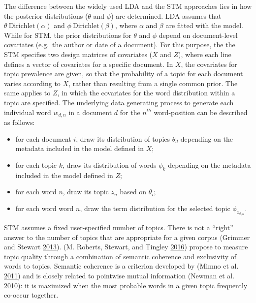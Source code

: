 \documentclass[
]{article}
\providecommand{\tightlist}{%
  \setlength{\itemsep}{0pt}\setlength{\parskip}{0pt}}
\begin{document}
The difference between the widely used LDA and the STM approaches lies
in how the posterior distributions (\(\theta\) and \(\phi\)) are
determined. LDA assumes that \(\theta ~ \text{Dirichlet}(\alpha)\) and
\(\phi ~ \text{Dirichlet}(\beta)\), where \(\alpha\) and \(\beta\) are
fitted with the model. While for STM, the prior distributions for
\(\theta\) and \(\phi\) depend on document-level covariates (e.g.~the
author or date of a document). For this purpose, the the STM specifies
two design matrices of covariates (\(X\) and \(Z\)), where each line
defines a vector of covariates for a specific document. In \(X\), the
covariates for topic prevalence are given, so that the probability of a
topic for each document varies according to \(X\), rather than resulting
from a single common prior. The same applies to \(Z\), in which the
covariates for the word distribution within a topic are specified. The
underlying data generating process to generate each individual word
\(w_{d,n}\) in a document \(d\) for the \(n^{th}\) word-position can be
described as follows:

\begin{itemize}
\tightlist
\item
  for each document \(i\), draw its distribution of topics \(\theta_d\)
  depending on the metadata included in the model defined in \(X\);
\item
  for each topic \(k\), draw its distribution of words \(\phi_k\)
  depending on the metadata included in the model defined in \(Z\);
\item
  for each word \(n\), draw its topic \(z_n\) based on \(\theta_i\);
\item
  for each word word \(n\), draw the term distribution for the selected
  topic \(\phi_{z_{d,n}}\).
\end{itemize}

STM assumes a fixed user-specified number of topics. There is not a
``right'' answer to the number of topics that are appropriate for a
given corpus (Grimmer and Stewart
\protect\hyperlink{ref-grimmer_text_2013}{2013}). (M. Roberts, Stewart,
and Tingley \protect\hyperlink{ref-roberts_stm:_2016}{2016}) propose to
measure topic quality through a combination of semantic coherence and
exclusivity of words to topics. Semantic coherence is a criterion
developed by (Mimno et al.
\protect\hyperlink{ref-mimno_optimizing_2011}{2011}) and is closely
related to pointwise mutual information (Newman et al.
\protect\hyperlink{ref-newman_automatic_2010}{2010}): it is maximized
when the most probable words in a given topic frequently co-occur
together.
\end{document}
